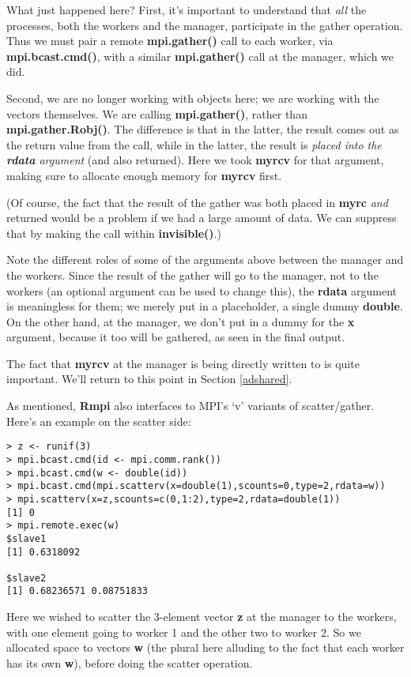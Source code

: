 What just happened here?  First, it's important to understand that {\it
all} the processes, both the workers and the manager, participate in the
gather operation.  Thus we must pair a remote {\bf mpi.gather()} call to
each worker, via {\bf mpi.bcast.cmd()}, with a similar {\bf
mpi.gather()} call at the manager, which we did.

Second, we are no longer working with objects here; we are working with
the vectors themselves.  We are calling {\bf mpi.gather()}, rather than
{\bf mpi.gather.Robj()}.  The difference is that in the latter, the
result comes out as the return value from the call, while in the latter,
the result is {\it placed into the {\bf rdata} argument} (and also
returned).  Here we took {\bf myrcv} for that argument, making sure to
allocate enough memory for {\bf myrcv} first.  

(Of course, the fact that the result of the gather was both placed in
{\bf myrc} {\it and} returned would be a problem if we had a large
amount of data.  We can suppress that by making the call within {\bf
invisible()}.)

Note the different roles of some of the arguments above between the
manager and the workers.  Since the result of the gather will go to the
manager, not to the workers (an optional argument can be used to change
this), the {\bf rdata} argument is meaningless for them; we merely put
in a placeholder, a single dummy {\bf double}.  On the other hand, at
the manager, we don't put in a dummy for the {\bf x} argument, because
it too will be gathered, as seen in the final output.

The fact that {\bf myrcv} at the manager is being directly written to is
quite important.  We'll return to this point in Section \ref{adshared}.

As mentioned, {\bf Rmpi} also interfaces to MPI's `v' variants of
scatter/gather.  Here's an example on the scatter side:

\begin{lstlisting}
> z <- runif(3)
> mpi.bcast.cmd(id <- mpi.comm.rank())
> mpi.bcast.cmd(w <- double(id))
> mpi.bcast.cmd(mpi.scatterv(x=double(1),scounts=0,type=2,rdata=w))
> mpi.scatterv(x=z,scounts=c(0,1:2),type=2,rdata=double(1))
[1] 0
> mpi.remote.exec(w)
$slave1
[1] 0.6318092

$slave2
[1] 0.68236571 0.08751833
\end{lstlisting}

Here we wished to scatter the 3-element vector {\bf z} at the manager to
the workers, with one element going to worker 1 and the other two to
worker 2.  So we allocated space to vectors {\bf w} (the plural here
alluding to the fact that each worker has its own {\bf w}), before doing
the scatter operation.

